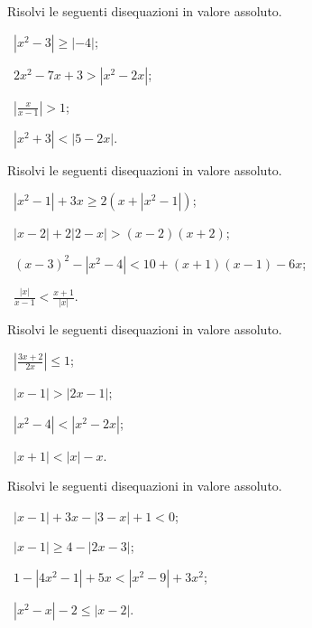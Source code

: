 \begin{esercizio}[\Ast]
 \label{ese:7.32}
Risolvi le seguenti disequazioni in valore assoluto.
\begin{multicols}{2}
 \begin{enumeratea}
 \item~$\left|x^2-3\right|\ge \left|-4\right|$;
 \item~$2x^2-7x+3>\left|x^2-2x\right|$;
 \item~$\left|\frac x{x-1}\right|>1$;
 \item~$\left|x^2+3\right|<\left|5-2x\right|$.
 \end{enumeratea}
 \end{multicols}
\end{esercizio}

\begin{esercizio}[\Ast]
 \label{ese:7.33}
Risolvi le seguenti disequazioni in valore assoluto.
\begin{multicols}{2}
 \begin{enumeratea}
 \item~$\left|x^2-1\right|+3x\ge 2\left(x+\left|x^2-1\right|\right)$;
 \item~$\left|x-2\right|+2\left|2-x\right|>(x-2)(x+2)$;
 \item~$(x-3)^2-\left|x^2-4\right|<10+(x+1)(x-1)-6x$;
 \item~$\frac{\left|x\right|}{x-1}<\frac{x+1}{\left|x\right|}$.
 \end{enumeratea}
 \end{multicols}
\end{esercizio}

\begin{esercizio}[\Ast]
 \label{ese:7.34}
Risolvi le seguenti disequazioni in valore assoluto.
\begin{multicols}{2}
 \begin{enumeratea}
 \item~$\left|\frac{3x+2}{2x}\right|\le 1$;
 \item~$\left|x-1\right|>\left|2x-1\right|$;
 \item~$\left|x^2-4\right|<\left|x^2-2x\right|$;
 \item~$\left|x+1\right|<\left|x\right|-x$.
 \end{enumeratea}
 \end{multicols}
\end{esercizio}

\begin{esercizio}[\Ast]
 \label{ese:7.35}
Risolvi le seguenti disequazioni in valore assoluto.
\begin{multicols}{2}
 \begin{enumeratea}
 \item~$\left|x-1\right|+3x-\left|3-x\right|+1<0$;
 \item~$\left|x-1\right|\ge 4-\left|2x-3\right|$;
 \item~$1-\left|4x^2-1\right|+5x<\left|x^2-9\right|+3x^2$;
 \item~$\left|x^2-x\right|-2\le \left|x-2\right|$.
 \end{enumeratea}
 \end{multicols}
\end{esercizio}

